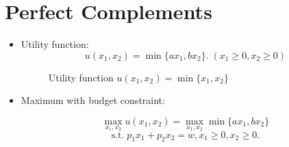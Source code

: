\documentclass[
12pt, %
a4paper, %
onecolumn, %
portrait %
]{article}
\begin{document}
\section{Perfect Complements}


\begin{itemize}
	\item Utility function:
	\[
	u(x_1,x_2)=\min\{ax_1,bx_2\}.\;(x_1\ge0,x_2\ge 0)
	\]
	\begin{figure}[H]
		\centering
		\caption{Utility function $u(x_1,x_2)=\min\{x_1,x_2\}$}
		\label{Fig.lable}
	\end{figure}	
	
	
	\item Maximum with budget constraint:
	
	\[
	\max_{x_1,x_2} u(x_1,x_2)=\max_{x_1,x_2}\min\{ax_1,bx_2\}
	\]
	\[
	\text{s.t.}\;p_1x_1+p_2x_2=w,x_1\ge0,x_2\ge 0.
	\]


\end{itemize}
\end{document}
